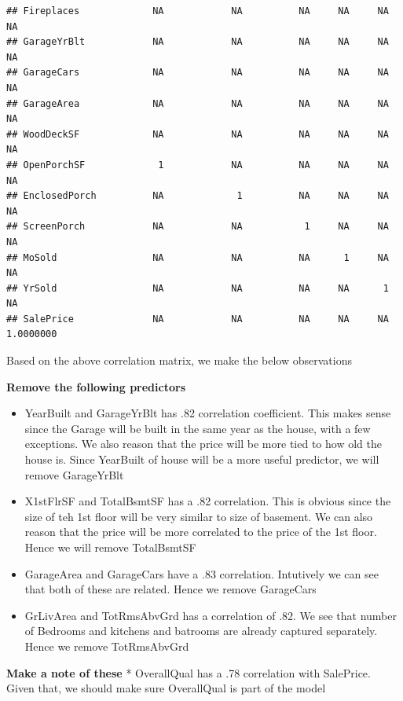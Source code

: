 \documentclass[
]{article}
\providecommand{\tightlist}{%
  \setlength{\itemsep}{0pt}\setlength{\parskip}{0pt}}
\begin{document}
\begin{verbatim}
## Fireplaces             NA            NA          NA     NA     NA        NA
## GarageYrBlt            NA            NA          NA     NA     NA        NA
## GarageCars             NA            NA          NA     NA     NA        NA
## GarageArea             NA            NA          NA     NA     NA        NA
## WoodDeckSF             NA            NA          NA     NA     NA        NA
## OpenPorchSF             1            NA          NA     NA     NA        NA
## EnclosedPorch          NA             1          NA     NA     NA        NA
## ScreenPorch            NA            NA           1     NA     NA        NA
## MoSold                 NA            NA          NA      1     NA        NA
## YrSold                 NA            NA          NA     NA      1        NA
## SalePrice              NA            NA          NA     NA     NA 1.0000000
\end{verbatim}

Based on the above correlation matrix, we make the below observations

\textbf{Remove the following predictors}

\begin{itemize}
\tightlist
\item
  YearBuilt and GarageYrBlt has .82 correlation coefficient. This makes sense since the Garage will be built in the same year as the house, with a few exceptions. We also reason that the price will be more tied to how old the house is. Since YearBuilt of house will be a more useful predictor, we will remove GarageYrBlt
\item
  X1stFlrSF and TotalBsmtSF has a .82 correlation. This is obvious since the size of teh 1st floor will be very similar to size of basement. We can also reason that the price will be more correlated to the price of the 1st floor. Hence we will remove TotalBsmtSF
\item
  GarageArea and GarageCars have a .83 correlation. Intutively we can see that both of these are related. Hence we remove GarageCars
\item
  GrLivArea and TotRmsAbvGrd has a correlation of .82. We see that number of Bedrooms and kitchens and batrooms are already captured separately. Hence we remove TotRmsAbvGrd
\end{itemize}

\textbf{Make a note of these}
* OverallQual has a .78 correlation with SalePrice. Given that, we should make sure OverallQual is part of the model
\end{document}
